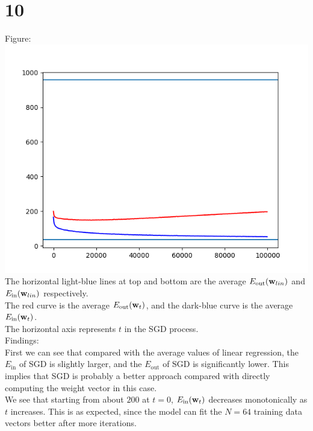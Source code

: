 \documentclass[11pt]{article}
\theoremstyle{definition}
\begin{document}
\section*{10}
Figure: \\
\includegraphics[width = \textwidth]{P10_fig2.png} \\
The horizontal light-blue lines at top and bottom are the average $E_{\text{out}}(\vb{w}_{lin})$ and $E_{\text{in}}(\vb{w}_{lin})$ respectively. \\ 
The red curve is the average $E_{\text{out}}(\vb{w}_t)$, and the dark-blue curve is the average $E_{\text{in}}(\vb{w}_t)$. \\  
The horizontal axis represents $t$ in the SGD process. \\ 
Findings: \\ 
First we can see that compared with the average values of linear regression, the $E_{\text{in}}$ of SGD is slightly larger, and the $E_{\text{out}}$ of SGD is significantly lower. This implies that SGD is probably a better approach compared with directly computing the weight vector in this case. \\ 
We see that starting from about $200$ at $t = 0$, $E_{\text{in}}(\vb{w}_t)$ decreases monotonically as $t$ increases. This is as expected, since the model can fit the $N = 64$ training data vectors better after more iterations. \\ 
\end{document}
